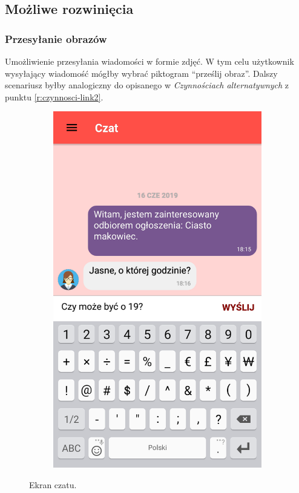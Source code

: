 \documentclass[licencjacka]{pracamgr}
\begin{document}
    \subsection{Możliwe rozwinięcia}
    \subsubsection{Przesyłanie obrazów}
    Umożliwienie przesyłania wiadomości w formie zdjęć. W tym celu użytkownik wysyłający wiadomość mógłby wybrać piktogram ``prześlij obraz''. Dalszy scenariusz byłby analogiczny do opisanego w \textit{Czynnościach alternatywnych} z punktu \ref{r:czynnosci-link2}.

\newpage
\begin{figure}[H]
  \centering
  \begin{subfigure}[b]{0.4\linewidth}
    \begin{framed}
      \includegraphics[width=\linewidth]{czat.png}
    \end{framed}
  \end{subfigure}
  \caption{Ekran czatu.}
  \label{fig:chat}
\end{figure}
\end{document}
